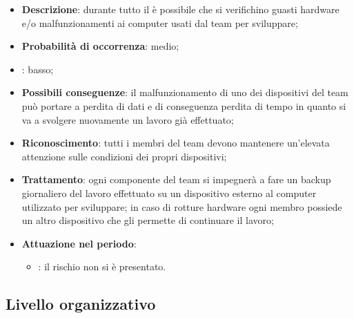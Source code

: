 \documentclass[PianoDiProgetto.tex]{subfiles}
\begin{document}
		\begin{itemize}
		\item \textbf{Descrizione}: durante tutto il  è possibile che si verifichino guasti hardware e/o malfunzionamenti  ai computer usati dal team per sviluppare;
		\item \textbf{Probabilità di occorrenza}: medio;
		\item : basso;
		\item \textbf{Possibili conseguenze}: il malfunzionamento di uno dei dispositivi del team può portare a perdita di dati e di conseguenza perdita di tempo in quanto si va a svolgere nuovamente un lavoro già effettuato;
		\item \textbf{Riconoscimento}: tutti i membri del team devono mantenere un'elevata attenzione sulle condizioni dei propri dispositivi;
		\item \textbf{Trattamento}: ogni componente del team si impegnerà a fare un backup giornaliero del lavoro effettuato su un dispositivo esterno al computer utilizzato per sviluppare; in caso di rotture hardware ogni membro possiede un altro dispositivo che gli permette di continuare il lavoro;
		\item \textbf{Attuazione nel periodo}: 
			\begin{itemize}
				\item \PerAR: il rischio non si è presentato.
			\end{itemize}
	
	\end{itemize}

	\subsection{Livello organizzativo}
\end{document}
